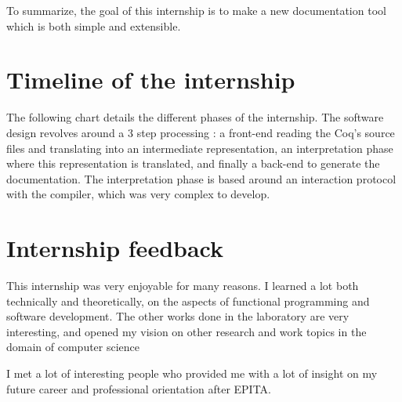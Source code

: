 \documentclass[a4paper, 11pt]{article}
\begin{document}
To summarize, the goal of this internship is to make a new documentation tool which is
both simple and extensible.
\section{Timeline of the internship}
The following chart details the different phases of the internship. The software
design revolves around a 3 step processing : a front-end reading the Coq's
source files and translating into an intermediate representation, an
interpretation phase where this representation is translated, and finally a
back-end to generate the documentation. The interpretation phase is based
around an interaction protocol with the compiler, which was very complex to
develop.
\newcommand{\start}[3]
{
  \node[text width=3cm] at (0 - 1,#2) {#1};
  \node at (0,#2) [circle, fill=black] {};
  \node[text width=10cm] at (0 + 6, #2) {#3};
}

\newcommand{\pt}[3]{
  \node[text width=3cm] at (0 - 1,-#2) {#1};
  \node at (0,-#2) [circle, fill=black] {};
  \node[text width=10cm] at (0 + 6, -#2) {#3};

  \draw (0, -#2) -- (0,0);
}

\clearpage
\section{Internship feedback}
This internship was very enjoyable for many reasons. I learned a lot both
technically and theoretically, on the aspects of functional programming and
software development. The other works done in the laboratory are very interesting,
and opened my vision on other research and work topics in the domain of computer
science

I met a lot of interesting people who provided me with a lot of insight on
my future career and professional orientation after EPITA.
\end{document}
